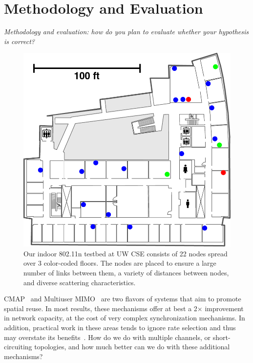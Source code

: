 \section{Methodology and Evaluation}
\label{sec:methodology}
\emph{\color{red}Methodology and evaluation: how do you plan to evaluate whether your hypothesis is correct?}

\begin{figure}[t]
      \centering
      \includegraphics[width=0.8\columnwidth]{figures/floor3_grayscale_noee_testbed.pdf}
      \caption{\label{fig:testbed} Our indoor 802.11n testbed at UW CSE consists of 22 nodes spread over 3 color-coded floors. The nodes are placed to ensure a large number of links between them, a variety of distances between nodes, and diverse scattering characteristics.}
\end{figure}



CMAP~\cite{vutukuru_cmap} and Multiuser MIMO~\cite{heath_mumimo,spencer_mumimo} are two flavors of systems that aim to promote spatial reuse. In most results, these mechanisms offer at best a 2$\times$ improvement in network capacity, at the cost of very complex synchronization mechanisms. In addition, practical work in these areas tends to ignore rate selection and thus may overstate its benefits~\cite{brodsky_csma}. How do we do with multiple channels, or short-circuiting topologies, and how much better can we do with these additional mechanisms?